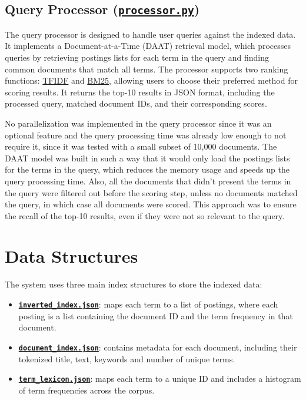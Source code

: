 
\subsection{Query Processor (\hyperref[subsec:query-processing]{\texttt{processor.py}})} \label{subsec:processor}

The query processor is designed to handle user queries against the indexed data. It implements a Document-at-a-Time (DAAT) retrieval model, which processes queries by retrieving postings lists for each term in the query and finding common documents that match all terms. The processor supports two ranking functions: \hyperref[eq:tfidf]{TFIDF} and \hyperref[eq:bm25]{BM25}, allowing users to choose their preferred method for scoring results. It returns the top-10 results in JSON format, including the processed query, matched document IDs, and their corresponding scores.

No parallelization was implemented in the query processor since it was an optional feature and the query processing time was already low enough to not require it, since it was tested with a small subset of 10,000 documents. The DAAT model was built in such a way that it would only load the postings lists for the terms in the query, which reduces the memory usage and speeds up the query processing time. Also, all the documents that didn't present the terms in the query were filtered out before the scoring step, unless no documents matched the query, in which case all documents were scored. This approach was to ensure the recall of the top-10 results, even if they were not so relevant to the query.

\section{Data Structures} \label{sec:data-structures}

The system uses three main index structures to store the indexed data:

\begin{itemize}
  \item \hyperref[subsec:ii]{\textbf{\texttt{inverted\_index.json}}}: maps each term to a list of postings, where each posting is a list containing the document ID and the term frequency in that document.
  \item \hyperref[subsec:di]{\textbf{\texttt{document\_index.json}}}: contains metadata for each document, including their tokenized title, text, keywords and number of unique terms.
  \item \hyperref[subsec:tl]{\textbf{\texttt{term\_lexicon.json}}}: maps each term to a unique ID and includes a histogram of term frequencies across the corpus.
\end{itemize}

